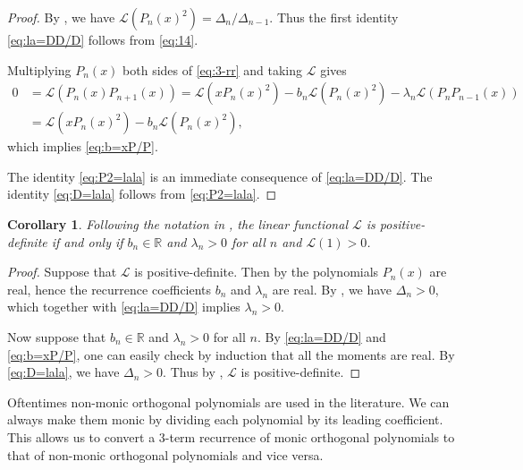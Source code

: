 \documentclass[oneside]{book}
\numberwithin{equation}{section}
\newtheorem{cor}[thm]{Corollary}
\theoremstyle{definition}
\newcommand{\RR}{\mathbb{R}}
\newcommand\LL{\mathcal{L}}
\begin{document}
\begin{proof}
  By , we have
  \( \LL(P_n(x)^2) = \Delta_n/\Delta_{n-1} \). Thus the first identity
  \eqref{eq:la=DD/D} follows from \eqref{eq:14}.

  Multiplying \( P_n(x) \) both sides of \eqref{eq:3-rr} and taking
  \( \LL \) gives
  \begin{align*}
    0 &= \LL(P_n(x)P_{n+1}(x))
       = \LL(xP_n(x)^2)- b_n\LL(P_n(x)^2) - \lambda_n \LL(P_nP_{n-1}(x))\\
    &= \LL(xP_n(x)^2)- b_n\LL(P_n(x)^2),
  \end{align*}
  which implies \eqref{eq:b=xP/P}.

  The identity \eqref{eq:P2=lala} is an immediate consequence of
  \eqref{eq:la=DD/D}. The identity \eqref{eq:D=lala} follows from
  \eqref{eq:P2=lala}.
\end{proof}

\begin{cor}\label{cor:la-pos-def}
  Following the notation in , the linear functional
  \( \LL \) is positive-definite if and only if \( b_n\in \RR \) and
  \( \lambda_n>0 \) for all \( n \) and \( \LL(1)>0 \).
\end{cor}
\begin{proof}
  Suppose that \( \LL \) is positive-definite. Then by
   the polynomials \( P_n(x) \) are real, hence
  the recurrence coefficients \( b_n \) and \( \lambda_n \) are real.
  By , we have \( \Delta_n>0 \), which
  together with \eqref{eq:la=DD/D} implies \( \lambda_n>0 \).

  Now suppose that \( b_n\in \RR \) and \( \lambda_n>0 \) for all
  \( n \). By \eqref{eq:la=DD/D} and \eqref{eq:b=xP/P}, one can easily
  check by induction that all the moments are real. By \eqref{eq:D=lala},
  we have \( \Delta_n>0 \). Thus by ,
  \( \LL \) is positive-definite.
\end{proof}

Oftentimes non-monic orthogonal polynomials are used in the
literature. We can always make them monic by dividing each polynomial
by its leading coefficient. This allows us to convert a 3-term
recurrence of monic orthogonal polynomials to that of non-monic
orthogonal polynomials and vice versa.
\end{document}
